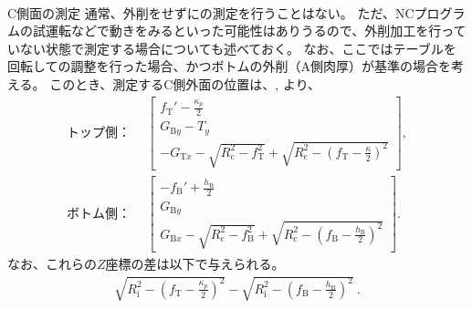 \clearpage
~\vfill
\begin{Column}{C側面の測定}
通常、外削をせずに\CenterlineEndFaceDifAC の測定を行うことはない。
ただ、NCプログラムの試運転などで動きをみるといった可能性はありうるので、外削加工を行っていない状態で測定する場合についても述べておく。
なお、ここではテーブルを回転して\AlocationLength の調整を行った場合、かつボトムの外削（A側肉厚）が基準の場合を考える。
このとき、測定するC側外面の位置は、, より、
\begin{align*}
  \text{トップ側：}~~
  & \left[
    \begin{array}{c}
      \displaystyle f_\mathrm T'-\frac{\kappa_p}2\\[5pt]
      G_{\mathrm By}-T_y\\[3pt]
      \displaystyle
      -G_{\mathrm Tx}
      -\sqrt{R_\mathrm c^2-f_\mathrm T^2}
      +\sqrt{R_\mathrm c^2-\left(f_\mathrm T-\frac\kappa2\right)^2}
    \end{array}
    \right],\\
  \text{ボトム側：}~~
  & \left[
    \begin{array}{c}
      \displaystyle -f_\mathrm B'+\frac{h_\mathrm B}2\\[5pt]
      G_{\mathrm By}\\[3pt]
      \displaystyle
      G_{\mathrm Bx}
      -\sqrt{R_\mathrm c^2-f_\mathrm B^2}
      +\sqrt{R_\mathrm c^2-\left(f_\mathrm B-\frac{h_\mathrm B}2\right)^2}
    \end{array}
    \right].
\end{align*}
なお、これらの$Z$座標の差は以下で与えられる。
\begin{align*}
  \sqrt{R_\mathrm i^2-\left(f_\mathrm T-\frac{\kappa_p}2\right)^2}
  -\sqrt{R_\mathrm i^2-\left(f_\mathrm B-\frac{h_\mathrm B}2\right)^2}~.
\end{align*}
\end{Column}
